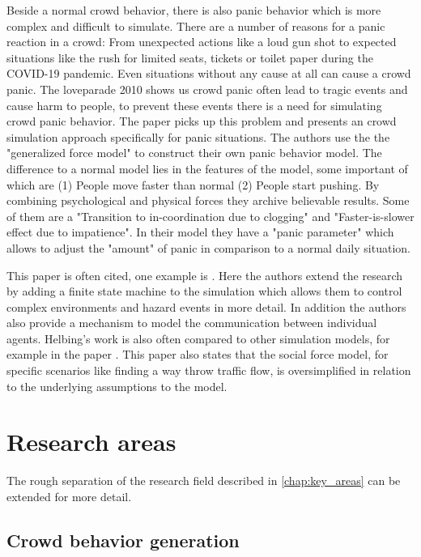 \documentclass{acmsiggraph}               %
\begin{document}
Beside a normal crowd behavior, there is also panic behavior which is more complex and difficult to simulate. There are a number of reasons for a panic reaction in a crowd: From unexpected actions like a loud gun shot to expected situations like the rush for limited seats, tickets or toilet paper during the COVID-19 pandemic. Even situations without any cause at all can cause a crowd panic. The loveparade 2010 shows us crowd panic often lead to tragic events and cause harm to people, to prevent these events there is a need for simulating crowd panic behavior. 
The paper \cite{helbing_simulating_2000} picks up this problem and presents an crowd simulation approach specifically for panic situations. The authors use the the "generalized force model" \cite{hindsley_investigation_1986} to construct their own panic behavior model. The difference to a normal model lies in the features of the model, some important of which are (1) People move faster than normal (2) People start pushing. By combining psychological and physical forces they archive believable results. Some of them are a "Transition to in-coordination due to clogging" and "Faster-is-slower effect due to impatience". 
In their model they have a "panic parameter" \label{term:panicParameter} which allows to adjust the "amount" of panic in comparison to a normal daily situation. 

This paper is often cited, one example is \cite{braun_simulating_2005}\label{exp:braun2005}. Here the authors extend the research by adding a finite state machine to the simulation which allows them to control complex environments and hazard events in more detail. In addition the authors also provide a mechanism to model the communication between individual agents. Helbing's work is also often compared to other simulation models, for example in the paper \cite{zheng_modeling_2009}. This paper also states that the social force model, for specific scenarios like finding a way throw traffic flow, is oversimplified in relation to the underlying assumptions to the model.

\section{Research areas}
\label{chap:researchAreas}

The rough separation of the research field described in \ref{chap:key_areas} can be extended for more detail.

\subsection{Crowd behavior generation}
\end{document}
